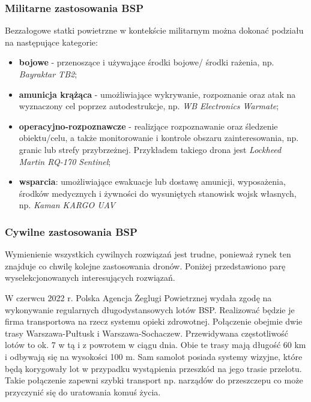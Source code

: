 \subsubsection{Militarne zastosowania BSP}
Bezzałogowe statki powietrzne w kontekście militarnym można dokonać podziału na następujące kategorie: 
\begin{itemize}
  \item \textbf{bojowe} - przenoszące i używające środki bojowe/ środki rażenia, np. \textit{Bayraktar TB2};
  \item \textbf{amunicja krążąca} - umożliwiające wykrywanie, rozpoznanie oraz atak na wyznaczony cel poprzez autodestrukcje, np. \textit{WB Electronics Warmate};
  \item \textbf{operacyjno-rozpoznawcze} - realizjące rozpoznawanie oraz śledzenie obiektu/celu, a także monitorowanie i kontrole obszaru zainteresowania, np. granic lub strefy przybrzeżnej. Przykładem takiego drona jest \textit{Lockheed Martin RQ-170 Sentinel};
  \item \textbf{wsparcia}: umożliwiające ewakuacje lub dostawę amunicji, wyposażenia, środków medycznych i żywności do wysuniętych stanowisk wojsk własnych, np. \textit{Kaman KARGO UAV} \cite{konkurs-mon}
\end{itemize}

\subsubsection{Cywilne zastosowania BSP}
Wymienienie wszystkich cywilnych rozwiązań jest trudne, ponieważ rynek ten znajduje co chwilę kolejne zastosowania dronów. Poniżej przedstawiono parę wyselekcjonowanych interesujących rozwiązań.

W czerwcu 2022 r. Polska Agencja Żeglugi Powietrznej wydała zgodę na wykonywanie regularnych długodystansowych lotów BSP. Realizować będzie je firma transportowa na rzecz systemu opieki zdrowotnej. Połączenie obejmie dwie trasy Warszawa-Pułtusk i Warszawa-Sochaczew. Przewidywana częstotliwość lotów to ok. 7 w tą i z powrotem w ciągu dnia. Obie te trasy mają długość 60 km i odbywają się na wysokości 100 m. Sam samolot posiada systemy wizyjne, które będą korygowały lot w przypadku wystąpienia przeszkód na jego trasie przelotu. Takie połączenie zapewni szybki transport np. narządów do przeszczepu co może przyczynić się do uratowania komuś życia. \cite{pansa-lot-medyczny}

